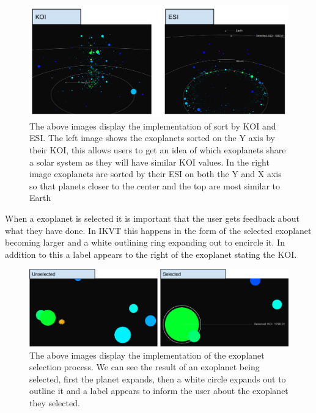 \begin{figure}[H]
  \centering
      \includegraphics[width=1\textwidth]{images/ESIKOI.pdf}
  \caption[Implementation of sort by KOI and ESI]{The above images display the
implementation of sort by KOI and ESI. The left image shows the exoplanets sorted on the Y axis
by their KOI, this allows users to get an idea of which exoplanets share a solar
system as they will have similar KOI values. In the right image exoplanets are
sorted by their ESI on both the Y and X axis so that planets closer to the
center and the top are most similar to Earth}  
    \label{fig:ESIKOI}
\end{figure}

When a exoplanet is selected it is important that the user gets feedback about
what they have done. In IKVT this happens in the form of the selected exoplanet
becoming larger and a white outlining ring expanding out to encircle it. In
addition to this a label appears to the right of the exoplanet stating the
KOI. 

\begin{figure}[H]
  \centering
      \includegraphics[width=1\textwidth]{images/selectedPlanet.jpg}
  \caption[Implementation of the exoplanet selection process]{The above images
display the implementation of the exoplanet selection process. We can see the
result of an exoplanet being selected, first the planet expands, then a white
circle expands out to outline it and a label appears to inform the user about
the exoplanet they selected.}  
    \label{fig:selectedPlanet}
\end{figure}

